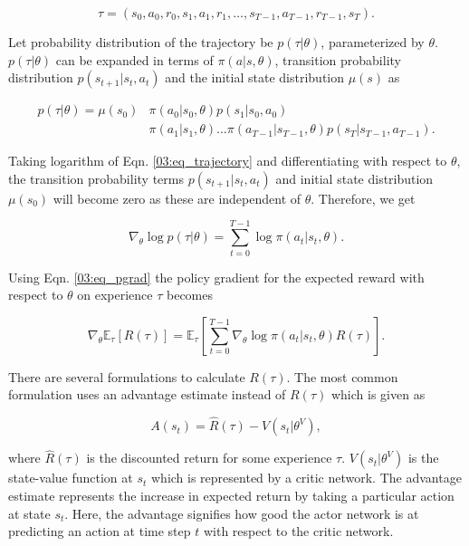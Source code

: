 \begin{equation}
\nonumber
\tau = (s_0, a_0, r_0, s_1, a_1, r_1, \dots, s_{T-1}, a_{T-1}, r_{T-1}, s_{T}).
\end{equation}

Let probability distribution of the trajectory be $p(\tau|\theta)$, parameterized by $\theta$. $p(\tau|\theta)$ can be expanded in terms of $\pi(a|s,\theta)$, transition probability distribution $p(s_{t+1}| s_t, a_t)$ and the initial state distribution $\mu(s)$ as

\begin{align} \label{03:eq_trajectory}
\nonumber
p(\tau|\theta) = \mu(s_0) & \pi(a_0|s_0, \theta) p(s_1|s_0, a_0) \\& \pi(a_1|s_1, \theta) \dots \pi(a_{T-1}|s_{T-1}, \theta) p(s_T|s_{T-1},a_{T-1}).
\end{align}

Taking logarithm of Eqn. \ref{03:eq_trajectory} and differentiating with respect to $\theta$, the transition probability terms $p(s_{t+1}| s_t, a_t)$ and initial state distribution $\mu(s_0)$ will become zero as these are independent of $\theta$. Therefore, we get

\begin{equation}
\nonumber
\nabla_\theta \log p(\tau|\theta) = \sum_{t=0}^{T-1}\log \pi(a_t|s_t,\theta).
\end{equation}

Using Eqn. \ref{03:eq_pgrad} the policy gradient for the expected reward with respect to $\theta$ on experience $\tau$ becomes 

\begin{equation}\label{03:eq_policygradient}
\nabla_\theta \mathbb{E}_\tau[R(\tau)] = \mathbb{E}_\tau \left [ \sum_{t=0}^{T-1} \nabla_\theta \log \pi(a_t| s_t, \theta) R(\tau) \right].
\end{equation}

There are several formulations to calculate $R(\tau)$. The most common formulation uses an advantage estimate instead of $R(\tau)$ which is given as

\begin{equation} \label{03:eq_adv}
A(s_t) = \hat{R}(\tau) - V(s_t|\theta^V),
\end{equation}

where $\hat{R}(\tau)$ is the discounted return for some experience $\tau$. $V(s_t|\theta^V)$ is the state-value function at $s_t$ which is represented by a critic network. The advantage estimate represents the increase in expected return by taking a particular action at state $s_t$. Here, the advantage signifies how good the actor network is at predicting an action at time step $t$ with respect to the critic network.

